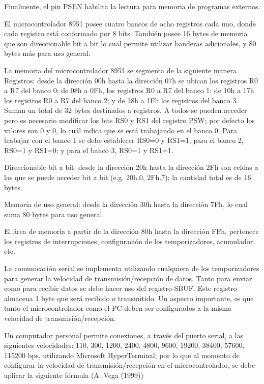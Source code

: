 	 Finalmente, el pin PSEN habilita la lectura para memoria de programas 
	externos. 
	
	El microcontrolador 8951 posee cuatro bancos de ocho registros cada uno, 
	donde cada registro está conformado por 8 bits. También posee 16 bytes de memoria 
	que son direccionable bit a bit lo cual permite utilizar banderas adicionales, y 80 
	bytes más para uso general.  
	
	 La memoria del microcontrolador 8951 se segmenta de la siguiente manera 
	Registros: desde la dirección 00h hasta la dirección 07h se ubican los registros R0 a 
	R7 del banco 0; de 08h a 0Fh, los registros R0 a R7 del banco 1; de 10h a 17h los 
	registros R0 a R7 del banco 2; y de 18h a 1Fh los registros del banco 3. Suman un 
	total de 32 bytes destinados a registros. A todos se pueden acceder pero es necesario 
	modificar los bits RS0 y RS1 del registro PSW; por defecto los valores son 0 y 0, lo 
	cuál indica que se está trabajando en el banco 0. Para trabajar con el banco 1 se debe 
	establecer RS0=0 y RS1=1; para el banco 2, RS0=1 y RS1=0; y para el banco 3, 
	RS0=1 y RS1=1. 
	
	Direccionable bit a bit: desde la dirección 20h hasta la dirección 2Fh son celdas a las 
	que se puede acceder bit a bit (e.g. 20h.0, 2Fh.7); la cantidad total es de 16 bytes. 

	Memoria de uso general: desde la dirección 30h hasta la dirección 7Fh, lo cual suma 
	80 bytes para uso general. 

	 El área de memoria a partir de la dirección 80h hasta la dirección FFh, 
	pertenece los registros de interrupciones, configuración de los temporizadores, 
	acumulador, etc. 
	
	 La comunicación serial se implementa utilizando cualquiera de los 
	temporizadores para generar la velocidad de transmisión/recepción de datos. Tanto 
	para enviar como para recibir datos se debe hacer uso del registro SBUF. Este registro 
	almacena 1 byte que será recibido o transmitido. Un aspecto importante, es que tanto 
	el microcontrolador como el PC deben ser configurados a la misma velocidad de 
	transmisión/recepción. 
	
	 Un computador personal permite conexiones, a través del puerto serial, a las 
	siguientes velocidades: 110, 300, 1200, 2400, 4800, 9600, 19200, 38400, 57600, 
	115200 bps, utilizando Microsoft HyperTerminal; por lo que al momento de 
	configurar la velocidad de transmisión/recepción en el microcontrolador, se debe 
	aplicar la siguiente fórmula (A. Vega (1999)) 
	
